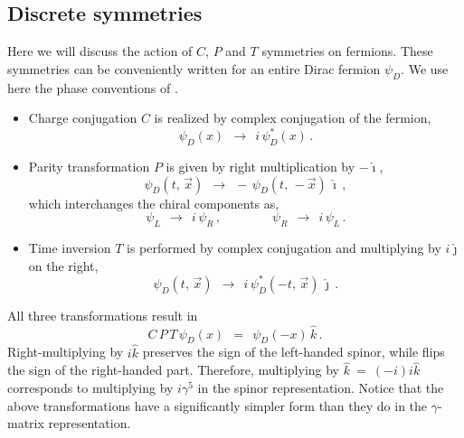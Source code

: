 \documentclass[epsfig,12pt]{article}
\newcommand{\ii}{\hat\imath}
\newcommand{\jj}{\hat\jmath}
\newcommand{\kk}{\hat k}
\begin{document}
\subsection{Discrete symmetries}
\label{section-discrete}

	Here we will discuss the action of $ C $, $ P $ and $ T $ symmetries on fermions.
	These symmetries can be conveniently written for an entire Dirac fermion $ \psi_D $.
	We use here the phase conventions of \cite{Berestetsky:1982aq}.

\begin{itemize}

\item
	Charge conjugation $ C $ is realized by complex conjugation of the fermion,
\begin{equation}
\label{C-trans}
	\psi_D(x)	~~\to~~		i\,\psi_D^*(x)\,.
\end{equation}

\item
	Parity transformation $ P $ is given by right multiplication by $ -\ii $,
\begin{equation}
\label{P-trans}
	\psi_D(t,\, \vec x)	~~\to~~		-\,\psi_D(t,\, -\vec x)\,\ii\,,
\end{equation}
	which interchanges the chiral components as,
\begin{equation}
	\psi_L	~~\to~~		i\,\psi_R\,,
	\qquad\qquad
	\psi_R	~~\to~~		i\,\psi_L\,.
\end{equation}

\item
	Time inversion $ T $ is performed by complex conjugation and 
	multiplying by $ i\jj $ on the right,
\begin{equation}
\label{T-trans}
	\psi_D(t,\, \vec x)	~~\to~~		i\,\psi_D^*(-t,\, \vec x)\,\jj\,.
\end{equation}

\end{itemize}

	All three transformations result in
\begin{equation}
\label{CPT-trans}
	C\,P\,T\, \psi_D(x)	~~=~~		\psi_D(-x)\,\kk\,.
\end{equation}
	Right-multiplying by $ i\kk $ preserves the sign of the left-handed spinor,
	while flips the sign of the right-handed part.
	Therefore, multiplying by $ \kk ~=~ (-i)i\kk $ corresponds to multiplying
	by $ i\gamma^5 $ in the spinor representation.
	Notice that the above transformations have a significantly simpler
	form than they do in the $ \gamma $-matrix representation.
\end{document}
